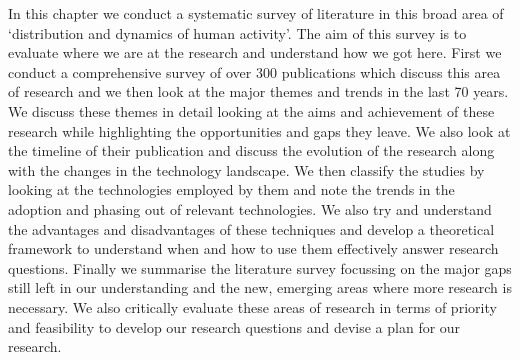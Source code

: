 In this chapter we conduct a systematic survey of literature in this broad area of `distribution and dynamics of human activity'.
The aim of this survey is to evaluate where we are at the research and understand how we got here.
First we conduct a comprehensive survey of over 300 publications which discuss this area of research and we then look at the major themes and trends in the last 70 years.
We discuss these themes in detail looking at the aims and achievement of these research while highlighting the opportunities and gaps they leave.
We also look at the timeline of their publication and discuss the evolution of the research along with the changes in the technology landscape.
We then classify the studies by looking at the technologies employed by them and note the trends in the adoption and phasing out of relevant technologies.
We also try and understand the advantages and disadvantages of these techniques and develop a theoretical framework to understand when and how to use them effectively answer research questions.
Finally we summarise the literature survey focussing on the major gaps still left in our understanding and the new, emerging areas where more research is necessary.
We also critically evaluate these areas of research in terms of priority and feasibility to develop our research questions and devise a plan for our research. 





